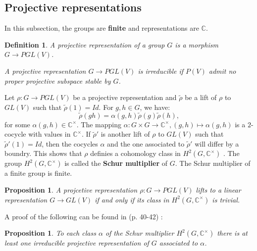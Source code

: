 \documentclass[12pt, reqno]{amsart}
\newtheorem{proposition}[theorem]{Proposition}
\newtheorem{definition}[theorem]{Definition}
\begin{document}
\subsection{Projective representations}
 In this subsection, the groups are \textbf{finite} and representations are  $\mathbb{C}$.
\begin{definition}
\item[1)]  A projective representation of a group $G$ is a morphism $G\to PGL(V)$.
\item[2)]  A projective representation $G \to PGL(V)$ is irreducible if $P(V)$ admit no proper projective subspace stable by $G$.
\end{definition} 
Let $\rho : G \to PGL(V)$ be a projective representation and $\tilde{\rho}$ be a lift of $\rho$ to $GL(V)$ such that $\tilde{\rho}(1)=Id$. For $g,h\in G$, we have:
$$\tilde{\rho}(gh)=\alpha(g,h)\tilde{\rho}(g)\tilde{\rho}(h),$$
for some $\alpha(g,h)\in \mathbb{C}^\times$. The mapping $\alpha :G\times G\to \mathbb{C}^\times,(g,h)\mapsto \alpha(g,h)$ is a $2$-cocycle with values in $\mathbb{C^\times}$. If $\tilde{\rho}'$ is another lift of $\rho$ to $GL(V)$ such that $\tilde{\rho}'(1)=Id$, then the cocycles $\alpha$ and the one associated to $\tilde{\rho}'$ will differ by a boundry. This shows that $\rho$ definies a cohomology class in $H^2(G,\mathbb{C}^\times)$ . The group $H^2(G,\mathbb{C}^\times)$ is called the \textbf{Schur multiplier} of $G$. The Schur multiplier of a finite group is finite.
\begin{proposition}
 A projcetive representation $\rho :G \to PGL(V)$ lifts to a linear representation $G\to GL(V)$ if and only if its class in $H^2(G,\mathbb{C}^\times)$ is trivial.
\end{proposition}
A proof of the following can be found in \cite{Sc} (p. 40-42) :
\begin{proposition}
To each class $\alpha$ of the Schur multiplier $H^2(G,\mathbb{C}^\times)$ there is at least one irreducible projective representation of $G$ associated to $\alpha$.
\end{proposition}
\end{document}
